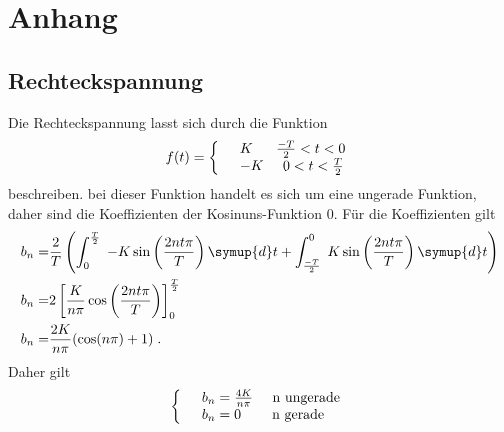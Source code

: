 \section{Anhang}
\label{sec:Anhang}
\subsection{Rechteckspannung}
\label{sec:Rechteckspannung}
Die Rechteckspannung lasst sich durch die Funktion
\begin{equation*}
  f(t)=\left\{
  \begin{array}{l l}
    &K   \;\;\;\;\;\;\frac{-T}{2}<t<0 \\
    &-K  \;\;\;\;\;0<t<\frac{T}{2}
  \end{array}
  \right.
\end{equation*}
beschreiben. bei dieser Funktion handelt es sich um eine ungerade Funktion, daher
sind die Koeffizienten der Kosinuns-Funktion $0$. Für die Koeffizienten gilt
\begin{align*}
  b_n=&\frac{2}{T}\left(\int^{\frac{T}{2}}_0\;-K\sin\left(\frac{2nt\pi}{T}\right)\symup{d}t+
\int^0_{\frac{-T}{2}}\;K\sin\left(\frac{2nt\pi}{T}\right)\symup{d}t\right)\\
  b_n=&2\left[ \frac{K}{n\pi}\cos\left(\frac{2nt\pi}{T}\right)\right]^{\frac{T}{2}}_0\\
  b_n=&\frac{2K}{n\pi}(\cos(n\pi)+1)\;.
\end{align*}
Daher gilt
\begin{equation*}
  \left\{
  \begin{array}{l l}
    &b_n=\frac{4K}{n\pi}   \;\;\;\;\;\text{n ungerade} \\
    &b_n=0  \;\;\;\;\;\;\;\;\text{n gerade}
  \end{array}
  \right.
\end{equation*}

